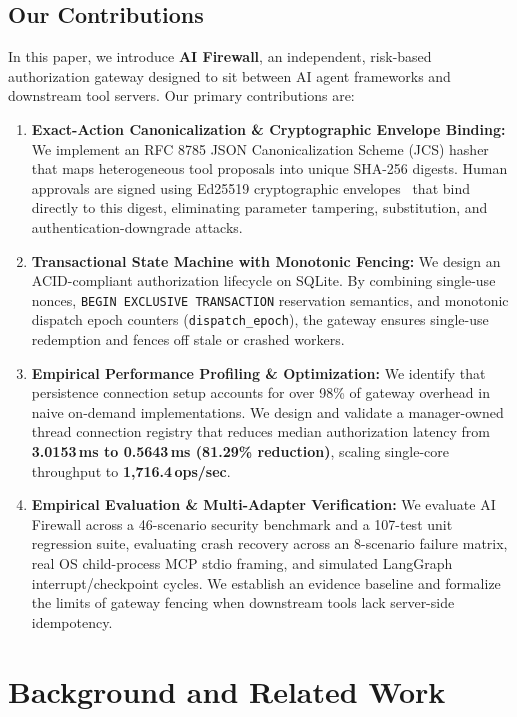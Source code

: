 \documentclass[sigconf,anonymous,review]{acmart}
\begin{document}
\subsection{Our Contributions}
In this paper, we introduce \textbf{AI Firewall}, an independent, risk-based authorization gateway designed to sit between AI agent frameworks and downstream tool servers. Our primary contributions are:
\begin{enumerate}
    \item \textbf{Exact-Action Canonicalization \& Cryptographic Envelope Binding:} We implement an RFC 8785 JSON Canonicalization Scheme (JCS) hasher~\cite{rfc8785} that maps heterogeneous tool proposals into unique SHA-256 digests. Human approvals are signed using Ed25519 cryptographic envelopes~\cite{rfc8032} that bind directly to this digest, eliminating parameter tampering, substitution, and authentication-downgrade attacks.
    \item \textbf{Transactional State Machine with Monotonic Fencing:} We design an ACID-compliant authorization lifecycle on SQLite. By combining single-use nonces, \texttt{BEGIN EXCLUSIVE TRANSACTION} reservation semantics, and monotonic dispatch epoch counters (\texttt{dispatch\_epoch}), the gateway ensures single-use redemption and fences off stale or crashed workers.
    \item \textbf{Empirical Performance Profiling \& Optimization:} We identify that persistence connection setup accounts for over 98\% of gateway overhead in naive on-demand implementations. We design and validate a manager-owned thread connection registry that reduces median authorization latency from \textbf{3.0153\,ms to 0.5643\,ms (81.29\% reduction)}, scaling single-core throughput to \textbf{1,716.4\,ops/sec}.
    \item \textbf{Empirical Evaluation \& Multi-Adapter Verification:} We evaluate AI Firewall across a 46-scenario security benchmark and a 107-test unit regression suite, evaluating crash recovery across an 8-scenario failure matrix, real OS child-process MCP stdio framing, and simulated LangGraph interrupt/checkpoint cycles. We establish an evidence baseline and formalize the limits of gateway fencing when downstream tools lack server-side idempotency.
\end{enumerate}

\section{Background and Related Work}
\end{document}
